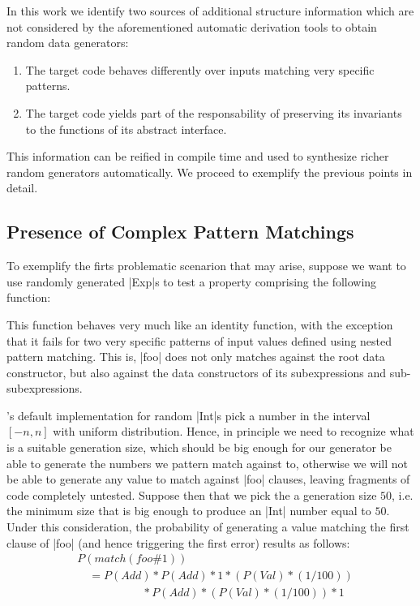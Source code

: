 In this work we identify two sources of additional structure information which
are not considered by the aforementioned automatic derivation tools to obtain
random data generators:

\begin{enumerate}
\item The target code behaves differently over inputs matching very specific
  patterns.
\item The target code yields part of the responsability of preserving its
  invariants to the functions of its abstract interface.
\end{enumerate}

This information can be reified in compile time and used to synthesize richer
random generators automatically. We proceed to exemplify the previous points in
detail.

\subsection{\textbf{Presence of Complex Pattern Matchings}}

To exemplify the firts problematic scenarion that may arise, suppose we want to
use randomly generated |Exp|s to test a property comprising the following
function:


This function behaves very much like an identity function, with the exception
that it fails for two very specific patterns of input values defined using
nested pattern matching.
%
This is, |foo| does not only matches against the root data constructor, but also
against the data constructors of its subexpressions and sub-subexpressions.


\quickcheck's default implementation for random |Int|s pick a number in the
interval $[-n, n]$ with uniform distribution.
%
Hence, in principle we need to recognize what is a suitable generation size,
which should be big enough for our generator be able to generate the numbers we
pattern match against to, otherwise we will not be able to generate any value to
match against |foo| clauses, leaving fragments of code completely untested.
%
Suppose then that we pick the a generation size $50$, i.e. the minimum size that
is big enough to produce an |Int| number equal to $50$.
%
Under this consideration, the probability of generating a value matching the
first clause of |foo| (and hence triggering the first error) results as follows:
%
\begin{align*}
  &P(match(foo\#1))\\
  &\quad = P(Add)       * P(Add) * 1 * (P(Val) * (1/100)) \\
  &\phantom{xxxxxxxxxx} * P(Add) * (P(Val) * (1/100)) * 1
\end{align*}

